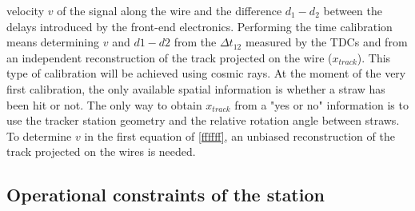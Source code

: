 velocity $v$ of the signal along the wire and 
the difference $d_1-d_2$ between the delays introduced by 
the front-end electronics. 
Performing the time calibration means 
determining $v$ and $d1-d2$ from the $\Delta t_{12}$ 
measured by the TDCs and from an independent 
reconstruction of the track 
projected on the wire ($x_{track}$).
This type of calibration will be 
achieved using cosmic rays. 
At the moment of the very first calibration, 
the only available spatial information is 
whether a straw has been hit or not. The 
only way to obtain $x_{track}$ from a "yes or no" 
information is to use the tracker station 
geometry and the relative rotation angle between straws. 
To determine $v$ in the first equation of \ref{ffffff}, 
an unbiased reconstruction of the 
track projected on the wires is needed.


\subsection{Operational constraints of the station}\label{gassystem}

